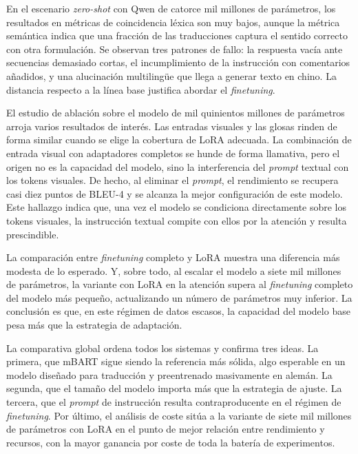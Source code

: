 \documentclass[11pt]{article}
\begin{document}
En el escenario \textit{zero-shot} con Qwen de catorce mil millones de parámetros, los resultados en métricas de coincidencia léxica son muy bajos, aunque la métrica semántica indica que una fracción de las traducciones captura el sentido correcto con otra formulación. Se observan tres patrones de fallo: la respuesta vacía ante secuencias demasiado cortas, el incumplimiento de la instrucción con comentarios añadidos, y una alucinación multilingüe que llega a generar texto en chino. La distancia respecto a la línea base justifica abordar el \textit{finetuning}.

El estudio de ablación sobre el modelo de mil quinientos millones de parámetros arroja varios resultados de interés. Las entradas visuales y las glosas rinden de forma similar cuando se elige la cobertura de LoRA adecuada. La combinación de entrada visual con adaptadores completos se hunde de forma llamativa, pero el origen no es la capacidad del modelo, sino la interferencia del \textit{prompt} textual con los tokens visuales. De hecho, al eliminar el \textit{prompt}, el rendimiento se recupera casi diez puntos de BLEU-4 y se alcanza la mejor configuración de este modelo. Este hallazgo indica que, una vez el modelo se condiciona directamente sobre los tokens visuales, la instrucción textual compite con ellos por la atención y resulta prescindible.

La comparación entre \textit{finetuning} completo y LoRA muestra una diferencia más modesta de lo esperado. Y, sobre todo, al escalar el modelo a siete mil millones de parámetros, la variante con LoRA en la atención supera al \textit{finetuning} completo del modelo más pequeño, actualizando un número de parámetros muy inferior. La conclusión es que, en este régimen de datos escasos, la capacidad del modelo base pesa más que la estrategia de adaptación.

La comparativa global ordena todos los sistemas y confirma tres ideas. La primera, que mBART sigue siendo la referencia más sólida, algo esperable en un modelo diseñado para traducción y preentrenado masivamente en alemán. La segunda, que el tamaño del modelo importa más que la estrategia de ajuste. La tercera, que el \textit{prompt} de instrucción resulta contraproducente en el régimen de \textit{finetuning}. Por último, el análisis de coste sitúa a la variante de siete mil millones de parámetros con LoRA en el punto de mejor relación entre rendimiento y recursos, con la mayor ganancia por coste de toda la batería de experimentos.

\end{document}
